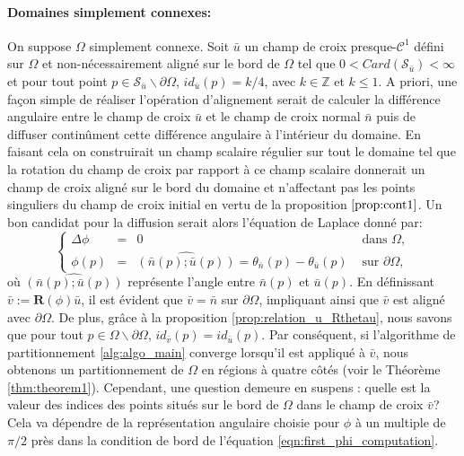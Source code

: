 \paragraph{Domaines simplement connexes:}
On suppose $\Omega$ simplement connexe. Soit $\bar{u}$ un champ de croix presque-$\mathcal{C}^1$ défini sur $\Omega$ et non-nécessairement aligné sur le bord de $\Omega$ tel que $0<Card(\mathcal{S}_{\bar{u}})<\infty$ et pour tout point $p\in\mathcal{S}_{\bar{u}}\backslash\partial\Omega$, $id_{\bar{u}}(p)=k/4$, avec $k\in\mathbb{Z}$ et $k\leq 1$. A priori, une façon simple de réaliser l'opération d'alignement serait de calculer la différence angulaire entre le champ de croix $\bar{u}$ et le champ de croix normal $\bar{n}$ puis de diffuser continûment cette différence angulaire à l'intérieur du domaine. En faisant cela on construirait un champ scalaire régulier sur tout le domaine tel que la rotation du champ de croix par rapport à ce champ scalaire donnerait un champ de croix aligné sur le bord du domaine et n'affectant pas les points singuliers du champ de croix initial en vertu de la proposition $\ref{prop:cont1}$. Un bon candidat pour la diffusion serait alors l'équation de Laplace donné par:
\begin{equation}
\left\{
\begin{array}{lcll}
\Delta\phi &=& 0 &\mbox{ dans }\Omega,\\[0.5cm]
\phi(p) &=& \widehat{(\bar{n}(p); \bar{u}(p))}=\theta_{\bar{n}}(p)-\theta_{\bar{u}}(p)&\mbox{ sur } \partial\Omega,
\end{array}
\right.
\label{eqn:first_phi_computation}
\end{equation}
où $\widehat{(\bar{n}(p); \bar{u}(p))}$ représente l'angle entre $\bar{n}(p)$ et $\bar{u}(p)$. En définissant $\bar{v}:=\mathbf{R}(\phi)\bar{u}$, il est évident que $\bar{v}=\bar{n}$ sur $\partial\Omega$, impliquant ainsi que $\bar{v}$ est aligné avec $\partial\Omega$. De plus, grâce à la proposition \ref{prop:relation_u_Rthetau}, nous savons que pour tout $p\in\Omega\backslash\partial\Omega$, $id_{\bar{v}}(p)=id_{\bar{u}}(p)$. Par conséquent, si l'algorithme de partitionnement \ref{alg:algo_main} converge lorsqu'il est appliqué à $\bar{v}$, nous obtenons un partitionnement de $\Omega$ en régions à quatre côtés (voir le Théorème \ref{thm:theorem1}). Cependant, une question demeure en suspens : quelle est la valeur des indices des points situés sur le bord de $\Omega$ dans le champ de croix $\bar{v}$? Cela va dépendre de la représentation angulaire choisie pour $\phi$ à un multiple de $\pi/2$ près dans la condition de bord de l'équation \eqref{eqn:first_phi_computation}.

